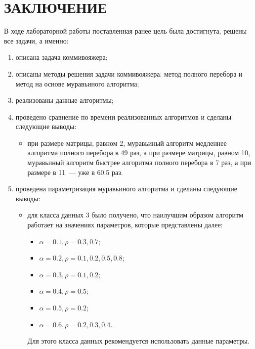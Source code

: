 \chapter*{ЗАКЛЮЧЕНИЕ}

В ходе лабораторной работы поставленная ранее цель была достигнута, решены все задачи, а именно:
\begin{enumerate}
	\item описана задача коммивояжера;
	\item описаны методы решения задачи коммивояжера: метод полного перебора и метод на основе муравьиного алгоритма;
	\item реализованы данные алгоритмы;
	\item проведено сравнение по времени реализованных алгоритмов и сделаны следующие выводы:
	\begin{itemize}
		\item при размере матрицы, равном 2, муравьиный алгоритм медленнее алгоритма полного перебора в 49 раз, а при размере матрицы, равном 10, муравьиный алгоритм быстрее алгоритма полного перебора в 7 раз, а при размере в 11~--- уже в 60.5 раз.
	\end{itemize}
	\item проведена параметризация муравьиного алгоритма и сделаны следующие выводы:
	\begin{itemize}
		\item для класса данных 3 было получено, что наилучшим образом алгоритм работает на значениях параметров, которые представлены далее:
		\begin{itemize}[label=---]
			\item $\alpha = 0.1, \rho = 0.3, 0.7$;
			\item $\alpha = 0.2, \rho = 0.1, 0.2, 0.5, 0.8$;
			\item $\alpha = 0.3, \rho = 0.1, 0.2$;
			\item $\alpha = 0.4, \rho = 0.5$;
			\item $\alpha = 0.5, \rho = 0.2$;
			\item $\alpha = 0.6, \rho = 0.2, 0.3, 0.4$.
		\end{itemize} 
		
		Для этого класса данных рекомендуется использовать данные параметры.
	\end{itemize}
\end{enumerate}